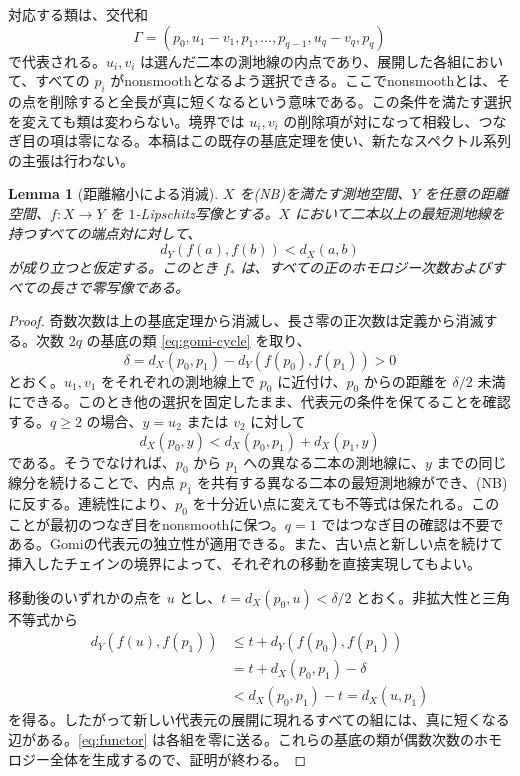 \documentclass[12pt]{amsart}
\newtheorem{lem}[thm]{Lemma}
\theoremstyle{definition}
\theoremstyle{remark}
\numberwithin{equation}{section}
\begin{document}
対応する類は、交代和
\begin{equation}\label{eq:gomi-cycle}
 \Gamma=(p_0,u_1-v_1,p_1,\ldots,p_{q-1},u_q-v_q,p_q)
\end{equation}
で代表される。$u_i,v_i$ は選んだ二本の測地線の内点であり、展開した各組において、すべての $p_i$ がnonsmoothとなるよう選択できる。ここでnonsmoothとは、その点を削除すると全長が真に短くなるという意味である。この条件を満たす選択を変えても類は変わらない。境界では $u_i,v_i$ の削除項が対になって相殺し、つなぎ目の項は零になる。本稿はこの既存の基底定理を使い、新たなスペクトル系列の主張は行わない。

\begin{lem}[距離縮小による消滅]\label{lem:contraction}
$X$ を(NB)を満たす測地空間、$Y$ を任意の距離空間、$f:X\to Y$ を $1$-Lipschitz写像とする。$X$ において二本以上の最短測地線を持つすべての端点対に対して、
\begin{equation}\label{eq:cut-contraction}
 d_Y(f(a),f(b))<d_X(a,b)
\end{equation}
が成り立つと仮定する。このとき $f_*$ は、すべての正のホモロジー次数およびすべての長さで零写像である。
\end{lem}
\begin{proof}
奇数次数は上の基底定理から消滅し、長さ零の正次数は定義から消滅する。次数 $2q$ の基底の類 \eqref{eq:gomi-cycle} を取り、
\[
 \delta=d_X(p_0,p_1)-d_Y(f(p_0),f(p_1))>0
\]
とおく。$u_1,v_1$ をそれぞれの測地線上で $p_0$ に近付け、$p_0$ からの距離を $\delta/2$ 未満にできる。このとき他の選択を固定したまま、代表元の条件を保てることを確認する。$q\ge2$ の場合、$y=u_2$ または $v_2$ に対して
\[
 d_X(p_0,y)<d_X(p_0,p_1)+d_X(p_1,y)
\]
である。そうでなければ、$p_0$ から $p_1$ への異なる二本の測地線に、$y$ までの同じ線分を続けることで、内点 $p_1$ を共有する異なる二本の最短測地線ができ、(NB)に反する。連続性により、$p_0$ を十分近い点に変えても不等式は保たれる。このことが最初のつなぎ目をnonsmoothに保つ。$q=1$ ではつなぎ目の確認は不要である。Gomiの代表元の独立性が適用できる。また、古い点と新しい点を続けて挿入したチェインの境界によって、それぞれの移動を直接実現してもよい。

移動後のいずれかの点を $u$ とし、$t=d_X(p_0,u)<\delta/2$ とおく。非拡大性と三角不等式から
\begin{align*}
 d_Y(f(u),f(p_1))&\le t+d_Y(f(p_0),f(p_1))\\
 &=t+d_X(p_0,p_1)-\delta\\
 &<d_X(p_0,p_1)-t=d_X(u,p_1)
\end{align*}
を得る。したがって新しい代表元の展開に現れるすべての組には、真に短くなる辺がある。\eqref{eq:functor} は各組を零に送る。これらの基底の類が偶数次数のホモロジー全体を生成するので、証明が終わる。
\end{proof}
\end{document}
